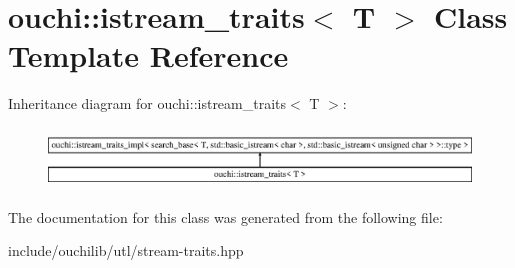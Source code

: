 \hypertarget{classouchi_1_1istream__traits}{}\section{ouchi\+::istream\+\_\+traits$<$ T $>$ Class Template Reference}
\label{classouchi_1_1istream__traits}
Inheritance diagram for ouchi\+::istream\+\_\+traits$<$ T $>$\+:\begin{figure}[H]
\begin{center}
\leavevmode
\includegraphics[height=1.623188cm]{classouchi_1_1istream__traits}
\end{center}
\end{figure}


The documentation for this class was generated from the following file\+:\begin{DoxyCompactItemize}
\item 
include/ouchilib/utl/stream-\/traits.\+hpp\end{DoxyCompactItemize}
